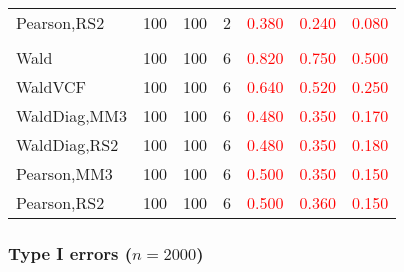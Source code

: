 \documentclass[
]{article}
\begin{document}
\begin{table}[H]
{\begin{tabular}[t]{lrrrrrr}
\hspace{1em}Pearson,RS2 & 100 & 100 & 2 & \textcolor{red}{0.380} & \textcolor{red}{0.240} & \textcolor{red}{0.080}\\
\addlinespace[0.3em]
\multicolumn{7}{l}{\textbf{3F 15V}}\\
\hspace{1em}Wald & 100 & 100 & 6 & \textcolor{red}{0.820} & \textcolor{red}{0.750} & \textcolor{red}{0.500}\\
\hspace{1em}WaldVCF & 100 & 100 & 6 & \textcolor{red}{0.640} & \textcolor{red}{0.520} & \textcolor{red}{0.250}\\
\hspace{1em}WaldDiag,MM3 & 100 & 100 & 6 & \textcolor{red}{0.480} & \textcolor{red}{0.350} & \textcolor{red}{0.170}\\
\hspace{1em}WaldDiag,RS2 & 100 & 100 & 6 & \textcolor{red}{0.480} & \textcolor{red}{0.350} & \textcolor{red}{0.180}\\
\hspace{1em}Pearson,MM3 & 100 & 100 & 6 & \textcolor{red}{0.500} & \textcolor{red}{0.350} & \textcolor{red}{0.150}\\
\hspace{1em}Pearson,RS2 & 100 & 100 & 6 & \textcolor{red}{0.500} & \textcolor{red}{0.360} & \textcolor{red}{0.150}\\
\bottomrule
\end{tabular}}
\endgroup{}
\end{table}

\hypertarget{type-i-errors-n2000-3}{%
\subsubsection{\texorpdfstring{Type I errors
(\(n=2000\))}{Type I errors (n=2000)}}\label{type-i-errors-n2000-3}}
\end{document}
